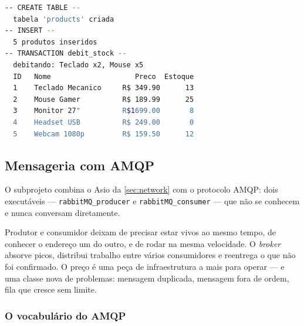 \begin{lstlisting}[style=bt, language=bash,
    caption={Saída medida de \texttt{./dist/bin/database} (cores removidas).
             O banco resultante ocupa 16\,KiB em \texttt{tmp/sqlite/academy.db}.}]
-- CREATE TABLE --
  tabela 'products' criada
-- INSERT --
  5 produtos inseridos
-- TRANSACTION debit_stock --
  debitando: Teclado x2, Mouse x5
  ID   Nome                    Preco  Estoque
  1    Teclado Mecanico     R$ 349.90      13
  2    Mouse Gamer          R$ 189.99      25
  3    Monitor 27"          R$1699.00       8
  4    Headset USB          R$ 249.00       0
  5    Webcam 1080p         R$ 159.50      12
\end{lstlisting}

\subsection{Mensageria com AMQP}
\label{sec:rabbitmq}

O subprojeto  combina o Asio da \cref{sec:network} com o
protocolo AMQP: dois executáveis --- \texttt{rabbitMQ\_producer} e
\texttt{rabbitMQ\_consumer} --- que não se conhecem e nunca conversam
diretamente.

\begin{porque}
Produtor e consumidor deixam de precisar estar vivos ao mesmo tempo, de conhecer
o endereço um do outro, e de rodar na mesma velocidade. O \emph{broker} absorve
picos, distribui trabalho entre vários consumidores e reentrega o que não foi
confirmado. O preço é uma peça de infraestrutura a mais para operar --- e uma
classe nova de problemas: mensagem duplicada, mensagem fora de ordem, fila que
cresce sem limite.
\end{porque}

\subsubsection{O vocabulário do AMQP}


